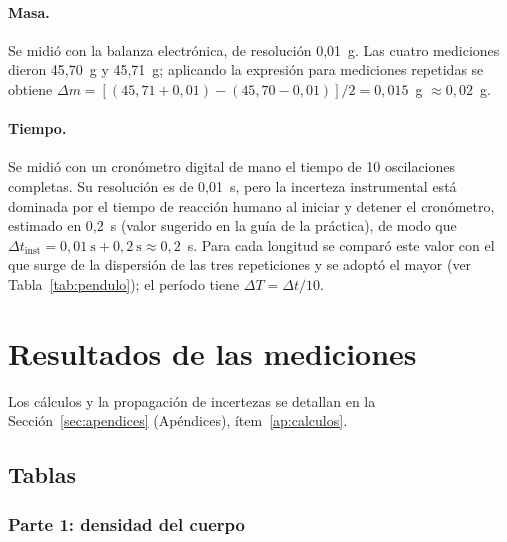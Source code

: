\documentclass[12pt,a4paper]{article}
\begin{document}
\paragraph{Masa.} Se midió con la balanza electrónica, de resolución 0,01~g. Las cuatro
mediciones dieron 45,70~g y 45,71~g; aplicando la expresión para mediciones repetidas se
obtiene $\Delta m = [(45{,}71 + 0{,}01) - (45{,}70 - 0{,}01)]/2 = 0{,}015$~g $\approx 0{,}02$~g.

\paragraph{Tiempo.} Se midió con un cronómetro digital de mano el tiempo de 10 oscilaciones
completas. Su resolución es de 0,01~s, pero la incerteza instrumental está dominada por el
tiempo de reacción humano al iniciar y detener el cronómetro, estimado en 0,2~s (valor
sugerido en la guía de la práctica), de modo que
$\Delta t_{\text{inst}} = 0{,}01\ \mathrm{s} + 0{,}2\ \mathrm{s} \approx 0{,}2$~s. Para
cada longitud se comparó este valor con el que surge de la dispersión de las tres
repeticiones y se adoptó el mayor (ver Tabla~\ref{tab:pendulo}); el período tiene
$\Delta T = \Delta t / 10$.

\section{Resultados de las mediciones}
\label{sec:resultados}
Los cálculos y la propagación de incertezas se detallan en la Sección~\ref{sec:apendices} (Apéndices), ítem~\ref{ap:calculos}.

\subsection{Tablas}

\subsubsection*{Parte 1: densidad del cuerpo}
\end{document}
